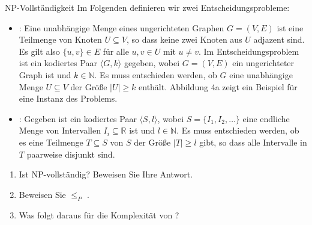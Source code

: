 \documentclass{article}
\begin{document}
\begin{exercise}{NP-Vollständigkeit}
  Im Folgenden definieren wir zwei Entscheidungsprobleme:
  \begin{itemize}
    \item {}: Eine unabhängige Menge eines ungerichteten Graphen $G = (V,E)$ ist eine Teilmenge von Knoten $U \subseteq V$, so dass keine zwei Knoten aus $U$ adjazent sind. Es gilt also $\{u,v\} \in E$ für alle $u,v \in U$ mit $u \neq v$. Im Entscheidungsproblem  ist ein kodiertes Paar $\langle G, k \rangle$ gegeben, wobei $G = (V,E)$ ein ungerichteter Graph ist und $k \in \mathbb{N}$. Es muss entschieden werden, ob $G$ eine unabhängige Menge $U \subseteq V$ der Größe $|U| \geq k$ enthält. Abbildung 4a zeigt ein Beispiel für eine Instanz des Problems.
    \item {}: Gegeben ist ein kodiertes Paar $\langle S, l \rangle$, wobei $S = \{I_1, I_2, \dots\}$ eine endliche Menge von Intervallen $I_i \subseteq \mathbb{R}$ ist und $l \in \mathbb{N}$. Es muss entschieden werden, ob es eine Teilmenge $T \subseteq S$ von $S$ der Größe $|T| \geq l$ gibt, so dass alle Intervalle in $T$ paarweise disjunkt sind.
  \end{itemize}
  \begin{enumerate}
    \item Ist  NP-vollständig? Beweisen Sie Ihre Antwort.
    \item Beweisen Sie  $\leq_P$ .
    \item Was folgt daraus für die Komplexität von ?
  \end{enumerate}


\end{exercise}
\end{document}
